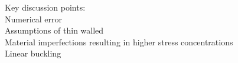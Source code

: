

Key discussion points:\\

Numerical error\\

Assumptions of thin walled\\

Material imperfections resulting in higher stress concentrations\\

Linear buckling\\